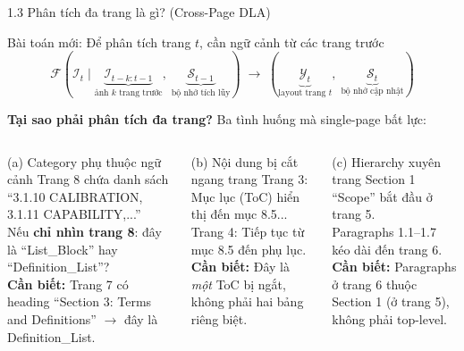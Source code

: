 \documentclass[aspectratio=1610,8pt]{beamer}
\begin{document}
\begin{frame}{1.3 \; Phân tích đa trang là gì? (Cross-Page DLA)}
    \begin{alertblock}{Bài toán mới: Để phân tích trang $t$, cần ngữ cảnh từ các trang trước}
        $$\mathcal{F}\!\left(\mathcal{I}_t \;\big|\; \underbrace{\mathcal{I}_{t-k:t-1}}_{\text{ảnh $k$ trang trước}},\; \underbrace{\mathcal{S}_{t-1}}_{\text{bộ nhớ tích lũy}}\right) \;\longrightarrow\; \left(\underbrace{\mathcal{Y}_t}_{\text{layout trang $t$}},\; \underbrace{\mathcal{S}_t}_{\text{bộ nhớ cập nhật}}\right)$$
    \end{alertblock}

    \vspace{0.2em}
    \textbf{Tại sao phải phân tích đa trang?} Ba tình huống mà single-page bất lực:

    \vspace{0.2em}
    \begin{columns}[T]
        \begin{exampleblock}{\small (a) Category phụ thuộc ngữ cảnh}
            {\scriptsize
            Trang 8 chứa danh sách ``3.1.10 CALIBRATION, 3.1.11 CAPABILITY,...''\\[0.3em]
            Nếu \textbf{chỉ nhìn trang 8}: đây là ``List\_Block'' hay ``Definition\_List''?\\[0.3em]
            \textbf{Cần biết:} Trang 7 có heading ``Section 3: Terms and Definitions'' $\rightarrow$ đây là Definition\_List.
            }
        \end{exampleblock}

        \begin{exampleblock}{\small (b) Nội dung bị cắt ngang trang}
            {\scriptsize
            Trang 3: Mục lục (ToC) hiển thị đến mục 8.5...\\[0.3em]
            Trang 4: Tiếp tục từ mục 8.5 đến phụ lục.\\[0.3em]
            \textbf{Cần biết:} Đây là \textit{một} ToC bị ngắt, không phải hai bảng riêng biệt.
            }
        \end{exampleblock}

        \begin{exampleblock}{\small (c) Hierarchy xuyên trang}
            {\scriptsize
            Section 1 ``Scope'' bắt đầu ở trang 5.\\
            Paragraphs 1.1--1.7 kéo dài đến trang 6.\\[0.3em]
            \textbf{Cần biết:} Paragraphs ở trang 6 thuộc Section 1 (ở trang 5), không phải top-level.
            }
        \end{exampleblock}
    \end{columns}


\end{frame}
\end{document}
